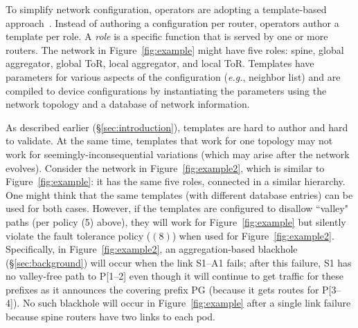 \documentclass[numbers, 10pt, preprint]{sigplanconf}
\newcommand{\EG}{\emph{e.g.}}
\begin{document}
To simplify network configuration, operators are adopting a template-based approach~\cite{hatch,thwack}. Instead of authoring a configuration per router, operators author a template per role.
%
A {\em role} is a specific function that is served by one or more routers.
%
The network in Figure~\ref{fig:example} might have five roles: spine, global aggregator, global ToR, local aggregator, and local ToR.
%
Templates have parameters for various aspects of the configuration (\EG, neighbor list) and are compiled to device configurations by instantiating the parameters using the network topology and a database of network information.


As described earlier (\S\ref{sec:introduction}), templates are hard to author and hard to validate. At the same time, templates that work for one topology may not work for seemingly-inconsequential variations (which may arise after the network evolves).
Consider the network in Figure~\ref{fig:example2}, which is similar to Figure~\ref{fig:example}: it has the same five roles, connected in a similar hierarchy. One might think that the same templates (with different database entries) can be used for both cases. However, if the templates are configured to disallow ``valley" paths (per policy (5) above), they will work for Figure~\ref{fig:example} but silently violate the fault tolerance policy ($(8)$) when used for Figure~\ref{fig:example2}.  Specifically, in Figure~\ref{fig:example2}, an aggregation-based blackhole (\S\ref{sec:background}) will occur when the link S1--A1 fails; after this failure, S1 has no valley-free path to P[1--2] even though it will continue to get traffic for these prefixes as it announces the covering prefix PG (because it gets routes for P[3--4]). No such blackhole will occur in Figure~\ref{fig:example} after a single link failure because spine routers have two links to each pod.
\end{document}

